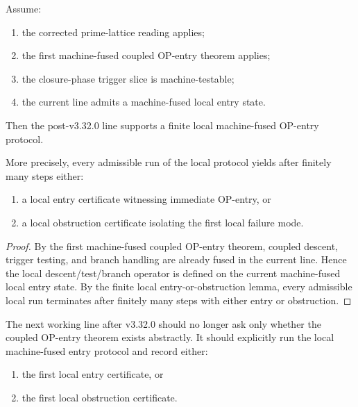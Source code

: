 \begin{theorem}
\label{thm:first-machine-fused-local-op-entry-protocol-theorem}
Assume:
\begin{enumerate}
    \item the corrected prime-lattice reading applies;
    \item the first machine-fused coupled OP-entry theorem applies;
    \item the closure-phase trigger slice is machine-testable;
    \item the current line admits a machine-fused local entry state.
\end{enumerate}
Then the post-v3.32.0 line supports a finite local machine-fused OP-entry protocol.

More precisely, every admissible run of the local protocol yields after finitely many steps either:
\begin{enumerate}
    \item a local entry certificate witnessing immediate OP-entry, or
    \item a local obstruction certificate isolating the first local failure mode.
\end{enumerate}
\end{theorem}

\begin{proof}
By the first machine-fused coupled OP-entry theorem, coupled descent, trigger testing, and branch handling are already fused in the current line. Hence the local descent/test/branch operator is defined on the current machine-fused local entry state.
By the finite local entry-or-obstruction lemma, every admissible local run terminates after finitely many steps with either entry or obstruction.
\end{proof}

\begin{corollary}
\label{cor:post-v3320-working-rule}
The next working line after v3.32.0 should no longer ask only whether the coupled OP-entry theorem exists abstractly.
It should explicitly run the local machine-fused entry protocol and record either:
\begin{enumerate}
    \item the first local entry certificate, or
    \item the first local obstruction certificate.
\end{enumerate}
\end{corollary}

